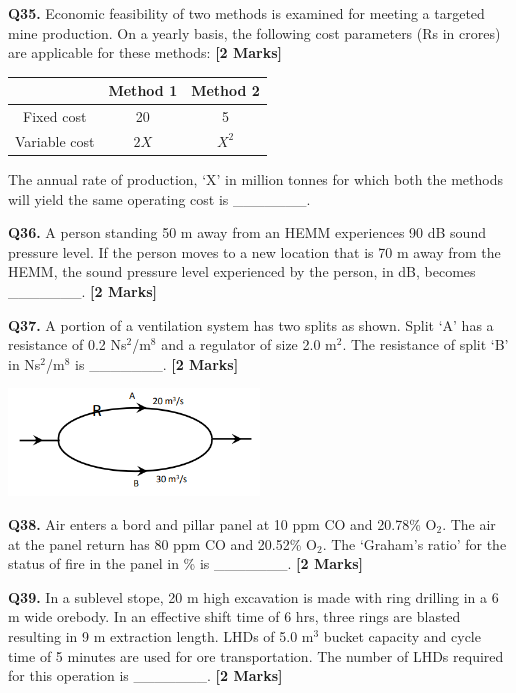 \documentclass[11pt]{article}
\newcommand{\questionb}[2]{
    \noindent\textbf{Q#2.} #1 \hfill \textbf{[2 Marks]}
}
\begin{document}
\questionb{Economic feasibility of two methods is examined for meeting a targeted mine production. On a yearly basis, the following cost parameters (Rs in crores) are applicable for these methods:}{35}
\begin{center}
\begin{tabular}{|c|c|c|}
\hline
 & Method 1 & Method 2 \\
\hline
Fixed cost & 20 & 5 \\
Variable cost & \(2X\) & \(X^2\) \\
\hline
\end{tabular}
\end{center}
The annual rate of production, ‘X’ in million tonnes for which both the methods will yield the same operating cost is \_\_\_\_\_\_\_.
\vspace{0.5cm}

\questionb{A person standing 50 m away from an HEMM experiences 90 dB sound pressure level. If the person moves to a new location that is 70 m away from the HEMM, the sound pressure level experienced by the person, in dB, becomes \_\_\_\_\_\_\_.}{36}
\vspace{0.5cm}

\questionb{A portion of a ventilation system has two splits as shown. Split ‘A’ has a resistance of 0.2 Ns\(^2\)/m\(^8\) and a regulator of size 2.0 m\(^2\). The resistance of split ‘B’ in Ns\(^2\)/m\(^8\) is \_\_\_\_\_\_\_.}{37}
\begin{center}
\includegraphics[width=0.5\textwidth]{figures/37.png}
\end{center}
\vspace{0.5cm}

\questionb{Air enters a bord and pillar panel at 10 ppm CO and 20.78\% O\(_2\). The air at the panel return has 80 ppm CO and 20.52\% O\(_2\). The ‘Graham’s ratio’ for the status of fire in the panel in \% is \_\_\_\_\_\_\_.}{38}
\vspace{0.5cm}

\questionb{In a sublevel stope, 20 m high excavation is made with ring drilling in a 6 m wide orebody. In an effective shift time of 6 hrs, three rings are blasted resulting in 9 m extraction length. LHDs of 5.0 m\(^3\) bucket capacity and cycle time of 5 minutes are used for ore transportation. The number of LHDs required for this operation is \_\_\_\_\_\_\_.}{39}
\vspace{0.5cm}
\end{document}
